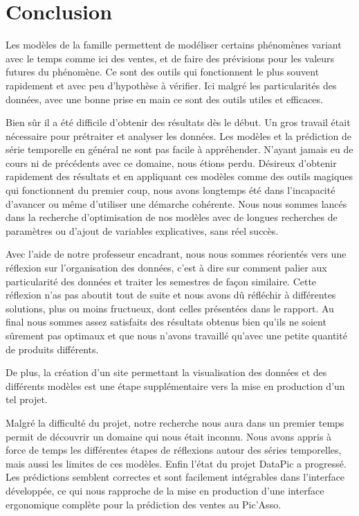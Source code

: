 \section{Conclusion}
\label{sec:conclusion}

Les modèles de la famille \ARIMA permettent de modéliser certains phénomènes variant avec le temps comme ici des ventes, et de faire des prévisions pour les valeurs futures du phénomène. Ce sont des outils qui fonctionnent le plus souvent rapidement et avec peu d'hypothèse à vérifier. Ici malgré les particularités des données, avec une bonne prise en main ce sont des outils utiles et efficaces.

Bien sûr il a été difficile d'obtenir des résultats dès le début. Un gros travail était nécessaire pour prétraiter et analyser les données. Les modèles \ARIMA et la prédiction de série temporelle en général ne sont pas facile à appréhender. N'ayant jamais eu de cours ni de précédents avec ce domaine, nous étions perdu. Désireux d'obtenir rapidement des résultats et en appliquant ces modèles comme des outils magiques qui fonctionnent du premier coup, nous avons longtemps été dans l'incapacité d'avancer ou même d'utiliser une démarche cohérente. Nous nous sommes lancés dans la recherche d'optimisation de nos modèles \ARIMA avec de longues recherches de paramètres ou d'ajout de variables explicatives, sans réel succès.

Avec l'aide de notre professeur encadrant, nous nous sommes réorientés vers une réflexion sur l'organisation des données, c'est à dire sur comment palier aux particularité des données et traiter les semestres de façon similaire. Cette réflexion n'as pas aboutit tout de suite et nous avons dû réfléchir à différentes solutions, plus ou moins fructueux, dont celles présentées dans le rapport. Au final nous sommes assez satisfaits des résultats obtenus bien qu'ils ne soient sûrement pas optimaux et que nous n'avons travaillé qu'avec une petite quantité de produits différents.

De plus, la création d'un site permettant la visualisation des données et des différents modèles est une étape supplémentaire vers la mise en production d'un tel projet.

Malgré la difficulté du projet, notre recherche nous aura dans un premier temps permit de découvrir un domaine qui nous était inconnu. Nous avons appris à force de temps les différentes étapes de réflexions autour des séries temporelles, mais aussi les limites de ces modèles. Enfin l'état du projet DataPic a progressé. Les prédictions semblent correctes et sont facilement intégrables dans l'interface développée, ce qui nous rapproche de la mise en production d'une interface ergonomique complète pour la prédiction des ventes au Pic'Asso.

\bigskip

